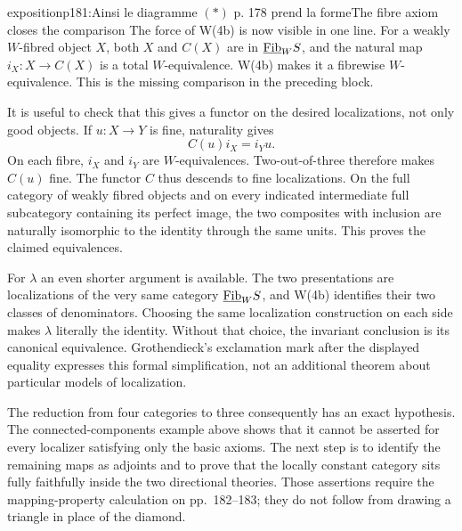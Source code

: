 \begin{dcomment}{exposition}{p181:Ainsi le diagramme $(\ast)$ p. 178 prend la forme}{The fibre axiom closes the comparison}
The force of W(4b) is now visible in one line. For a weakly $W$-fibred object $X$, both $X$ and $C(X)$ are in $\underline{\mathrm{Fib}}_W S$, and the natural map $i_X:X\to C(X)$ is a total $W$-equivalence. W(4b) makes it a fibrewise $W$-equivalence. This is the missing comparison in the preceding block.

It is useful to check that this gives a functor on the desired localizations, not only good objects. If $u:X\to Y$ is fine, naturality gives
\[
 C(u)i_X=i_Yu.
\]
On each fibre, $i_X$ and $i_Y$ are $W$-equivalences. Two-out-of-three therefore makes $C(u)$ fine. The functor $C$ thus descends to fine localizations. On the full category of weakly fibred objects and on every indicated intermediate full subcategory containing its perfect image, the two composites with inclusion are naturally isomorphic to the identity through the same units. This proves the claimed equivalences.

For $\lambda$ an even shorter argument is available. The two presentations are localizations of the very same category $\underline{\mathrm{Fib}}_W S$, and W(4b) identifies their two classes of denominators. Choosing the same localization construction on each side makes $\lambda$ literally the identity. Without that choice, the invariant conclusion is its canonical equivalence. Grothendieck's exclamation mark after the displayed equality expresses this formal simplification, not an additional theorem about particular models of localization.

The reduction from four categories to three consequently has an exact hypothesis. The connected-components example above shows that it cannot be asserted for every localizer satisfying only the basic axioms. The next step is to identify the remaining maps as adjoints and to prove that the locally constant category sits fully faithfully inside the two directional theories. Those assertions require the mapping-property calculation on pp.~182--183; they do not follow from drawing a triangle in place of the diamond.
\end{dcomment}


